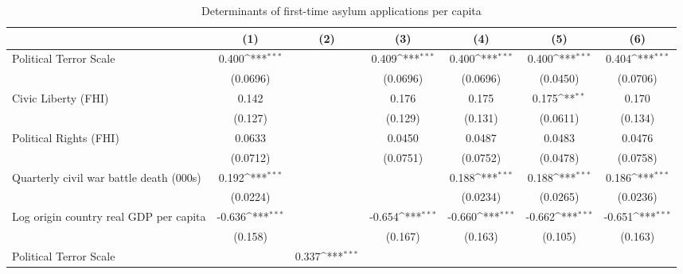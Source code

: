 \begin{table}[htbp]\centering
\def\sym#1{\ifmmode^{#1}\else\(^{#1}\)\fi}
\caption{Determinants of first-time asylum applications per capita}
\begin{tabular}{l*{6}{c}}
\hline\hline
                    &\multicolumn{1}{c}{(1)}         &\multicolumn{1}{c}{(2)}         &\multicolumn{1}{c}{(3)}         &\multicolumn{1}{c}{(4)}         &\multicolumn{1}{c}{(5)}         &\multicolumn{1}{c}{(6)}         \\
\hline
Political Terror Scale&       0.400\sym{***}&                     &       0.409\sym{***}&       0.400\sym{***}&       0.400\sym{***}&       0.404\sym{***}\\
                    &    (0.0696)         &                     &    (0.0696)         &    (0.0696)         &    (0.0450)         &    (0.0706)         \\
[1em]
Civic Liberty (FHI) &       0.142         &                     &       0.176         &       0.175         &       0.175\sym{**} &       0.170         \\
                    &     (0.127)         &                     &     (0.129)         &     (0.131)         &    (0.0611)         &     (0.134)         \\
[1em]
Political Rights (FHI)&      0.0633         &                     &      0.0450         &      0.0487         &      0.0483         &      0.0476         \\
                    &    (0.0712)         &                     &    (0.0751)         &    (0.0752)         &    (0.0478)         &    (0.0758)         \\
[1em]
Quarterly civil war battle death (000s)&       0.192\sym{***}&                     &                     &       0.188\sym{***}&       0.188\sym{***}&       0.186\sym{***}\\
                    &    (0.0224)         &                     &                     &    (0.0234)         &    (0.0265)         &    (0.0236)         \\
[1em]
Log origin country real GDP per capita&      -0.636\sym{***}&                     &      -0.654\sym{***}&      -0.660\sym{***}&      -0.662\sym{***}&      -0.651\sym{***}\\
                    &     (0.158)         &                     &     (0.167)         &     (0.163)         &     (0.105)         &     (0.163)         \\
[1em]
Political Terror Scale&                     &       0.337\sym{***}&                     &                     &                     &                     \\

\end{tabular}
\end{table}
